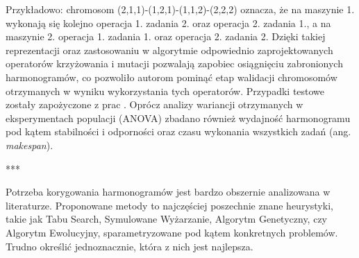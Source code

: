 \documentclass[archivemode]{mgr}
\begin{document}
Przykładowo: chromosom (2,1,1)-(1,2,1)-(1,1,2)-(2,2,2) oznacza, że na maszynie 1. wykonają się kolejno operacja 1. zadania 2. oraz operacja 2. zadania 1., a na maszynie 2. operacja 1. zadania 1. oraz operacja 2. zadania 2. Dzięki takiej reprezentacji oraz zastosowaniu w algorytmie odpowiednio zaprojektowanych operatorów krzyżowania i mutacji pozwalają zapobiec osiągnięciu zabronionych harmonogramów, co pozwoliło autorom pominąć etap walidacji chromosomów otrzymanych w wyniku wykorzystania tych operatorów. Przypadki testowe zostały zapożyczone z prac \cite{Kacem2002b,Mesghouni1997,LeeDiCesare1994,Kacem2002a,Brandimarte1993}. Oprócz analizy wariancji otrzymanych w eksperymentach populacji (ANOVA) zbadano również wydajność harmonogramu pod kątem stabilności i odporności oraz czasu wykonania wszystkich zadań (ang. \emph{makespan}).
\begin{center}***\\\end{center}
Potrzeba korygowania harmonogramów jest bardzo obszernie analizowana w literaturze. Proponowane metody to najczęściej poszechnie znane heurystyki, takie jak Tabu Search, Symulowane Wyżarzanie, Algorytm Genetyczny, czy Algorytm Ewolucyjny, sparametryzowane pod kątem konkretnych problemów. Trudno określić jednoznacznie, która z nich jest najlepsza.
%
%
%
\end{document}
